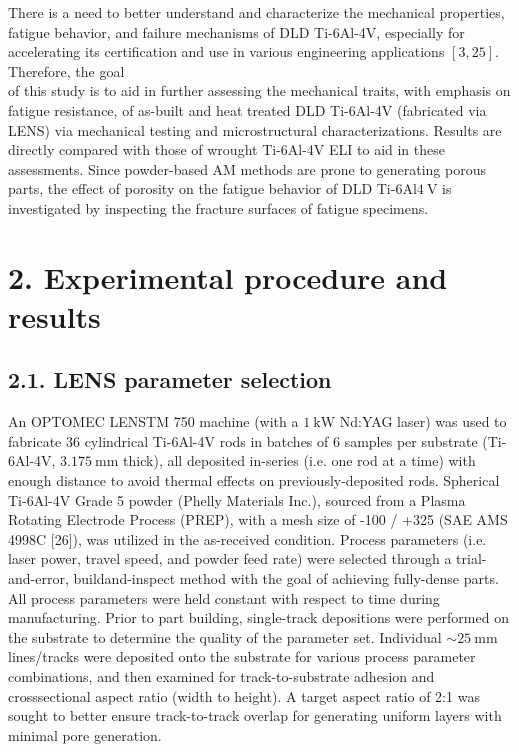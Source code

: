 \documentclass[10pt]{article}
\begin{document}
There is a need to better understand and characterize the mechanical properties, fatigue behavior, and failure mechanisms of DLD Ti-6Al-4V, especially for accelerating its certification and use in various engineering applications $[3,25]$. Therefore, the goal\\
of this study is to aid in further assessing the mechanical traits, with emphasis on fatigue resistance, of as-built and heat treated DLD Ti-6Al-4V (fabricated via LENS) via mechanical testing and microstructural characterizations. Results are directly compared with those of wrought Ti-6Al-4V ELI to aid in these assessments. Since powder-based AM methods are prone to generating porous parts, the effect of porosity on the fatigue behavior of DLD Ti-6Al$4 \mathrm{~V}$ is investigated by inspecting the fracture surfaces of fatigue specimens.

\section*{2. Experimental procedure and results}
\subsection*{2.1. LENS parameter selection}
An OPTOMEC LENSTM 750 machine (with a $1 \mathrm{~kW}$ Nd:YAG laser) was used to fabricate 36 cylindrical Ti-6Al-4V rods in batches of 6 samples per substrate (Ti-6Al-4V, $3.175 \mathrm{~mm}$ thick), all deposited in-series (i.e. one rod at a time) with enough distance to avoid thermal effects on previously-deposited rods. Spherical Ti-6Al-4V Grade 5 powder (Phelly Materials Inc.), sourced from a Plasma Rotating Electrode Process (PREP), with a mesh size of -100 / +325 (SAE AMS 4998C [26]), was utilized in the as-received condition. Process parameters (i.e. laser power, travel speed, and powder feed rate) were selected through a trial-and-error, buildand-inspect method with the goal of achieving fully-dense parts. All process parameters were held constant with respect to time during manufacturing. Prior to part building, single-track depositions were performed on the substrate to determine the quality of the parameter set. Individual $\sim 25 \mathrm{~mm}$ lines/tracks were deposited onto the substrate for various process parameter combinations, and then examined for track-to-substrate adhesion and crosssectional aspect ratio (width to height). A target aspect ratio of 2:1 was sought to better ensure track-to-track overlap for generating uniform layers with minimal pore generation.
\end{document}
